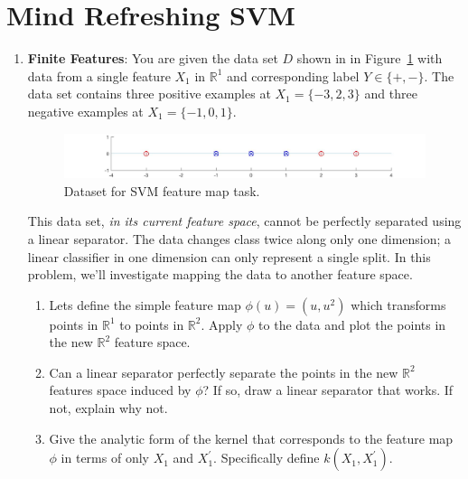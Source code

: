 \section{Mind Refreshing SVM }

\begin{enumerate}
\item \textbf{Finite Features}: You are given the data set $D$ shown
  in in Figure~\ref{fig:svm_dataset} with data from a single feature
  $X_1$ in $\mathbb{R}^1$ and corresponding label $Y\in\{+,-\}$. The
  data set contains three positive examples at $X_1=\{-3,2,3\}$ and
  three negative examples at $X_1=\{-1,0,1\}$.

  \begin{figure}[h]
    \begin{center}
      \includegraphics[width=7in]{images/svm_dataset.jpg}
    \end{center}
    \caption{Dataset for SVM feature map task.}
    \label{fig:svm_dataset}
  \end{figure}
  
  This data set, \emph{in its current feature space}, cannot be
  perfectly separated using a linear separator.  The data changes
  class twice along only one dimension; a linear classifier in one
  dimension can only represent a single split.  In this problem, we'll
  investigate mapping the data to another feature space.

  \begin{enumerate}
  \item {} Lets define the simple feature map
    $\phi(u)=(u,u^2)$ which transforms points in $\mathbb{R}^1$ to
    points in $\mathbb{R}^2$.  Apply $\phi$ to the data and plot the
    points in the new $\mathbb{R}^2$ feature space.
  

  \item {} Can a linear separator perfectly separate the
    points in the new $\mathbb{R}^2$ features space induced by $\phi$?
    If so, draw a linear separator that works.  If not, explain why
    not.


  \item {} Give the analytic form of the kernel that
    corresponds to the feature map $\phi$ in terms of only $X_1$ and
    $X_1^{\prime}$.  Specifically define $k(X_1,X_1^{\prime})$.
    


\end{enumerate}
\end{enumerate}
